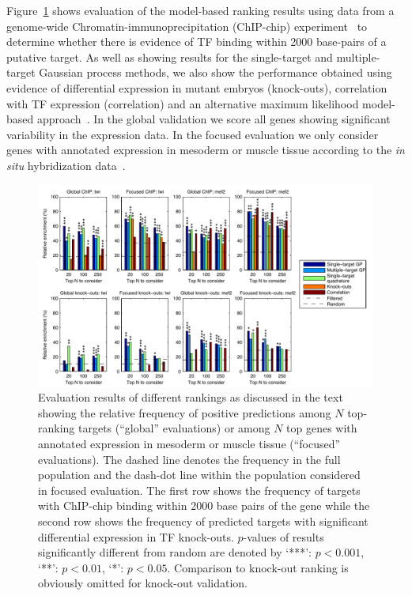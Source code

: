 \documentclass{article}
\begin{document}
Figure~\ref{fig:dros_global_evaluation} shows evaluation of the
model-based ranking results using data from a genome-wide
Chromatin-immunoprecipitation (ChIP-chip) experiment~\citep{Zinzen2009} to determine
whether there is evidence of TF binding within 2000
base-pairs of a putative target. As well as showing results for
the single-target and multiple-target Gaussian process methods, we
also show the performance obtained using evidence of differential
expression in mutant embryos (knock-outs),
correlation with TF expression (correlation) and an alternative
maximum likelihood model-based approach~\citep[quadrature, see][for
  details]{Honkela:modelbased10}. In the global validation we score
all genes showing significant variability in the expression data. In
the focused evaluation we only consider genes with annotated
expression in mesoderm or muscle tissue according to the {\em in situ}
hybridization data~\citep{Tomancak2002}.

\begin{figure}[tb]
  \centering
  \includegraphics[width=12cm]{../disim_pnas/fig3}
  \caption{Evaluation results of different rankings
    \citep[from][]{Honkela:modelbased10} as
    discussed in the text showing the relative frequency of positive
    predictions among $N$ top-ranking targets (``global'' evaluations)
    or among $N$ top genes
    with annotated expression in mesoderm or muscle tissue
    (``focused'' evaluations).
    The dashed line
    denotes the frequency in the full population and the dash-dot
    line within the population considered in focused evaluation.
    The first row shows the frequency of targets with ChIP-chip
    binding within 2000 base pairs of the gene
    while the second row shows the frequency of
    predicted targets with significant differential
    expression in TF knock-outs.
    $p$-values of results significantly different from random are
    denoted by `***': $p <
    0.001$, `**': $p < 0.01$, `*': $p < 0.05$.
    Comparison to knock-out ranking is obviously omitted for knock-out
    validation. \label{fig:dros_global_evaluation}
  }
\end{figure}
\end{document}
